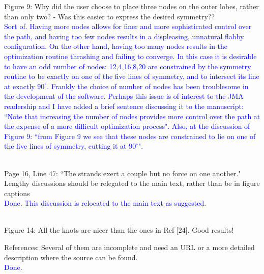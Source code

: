\documentclass[12pt]{article}
\begin{document}
Figure 9: Why did the user choose to place three nodes on the outer
lobes, rather than only two? - Was this easier to express the desired
symmetry??  \textcolor{blue}{\\Sort of.  Having more nodes allows for
  finer and more sophisticated control over the path, and having too
  few nodes results in a displeasing, unnatural flabby configuration.
  On the other hand, having too many nodes results in the optimization
  routine thrashing and failing to converge.  In this case it is
  desirable to have an odd number of nodes: 12,4,16,8,20 are
  constrained by the symmetry routine to be exactly on one of the five
  lines of symmetry, and to intersect its line at exactly $90^\circ$.
  Frankly the choice of number of nodes has been troublesome in the
  development of the software.  Perhaps this issue is of interest to
  the JMA readership and I have added a brief sentence discussing it
  to the manuscript: ``Note that increasing the number of nodes
  provides more control over the path at the expense of a more
  difficult optimization process".  Also, at the discussion of Figure
  9: ``from Figure 9 we see that these nodes are constrained to lie on
  one of the five lines of symmetry, cutting it at $90^\circ$".\\ \\}

Page 16, Line 47: ``The strands exert a couple but no force on one
another."  Lengthy discussions should be relegated to the main text,
rather than be in figure captions \textcolor{blue}{\\Done.  This
  discussion is relocated to the main text as suggested.\\ \\}


Figure 14: All the knots are nicer than the ones in Ref [24].  Good
results!

References: Several of them are incomplete and need an URL or a more
detailed description where the source can be found.
\textcolor{blue}{\\Done. \\ \\}
\end{document}
